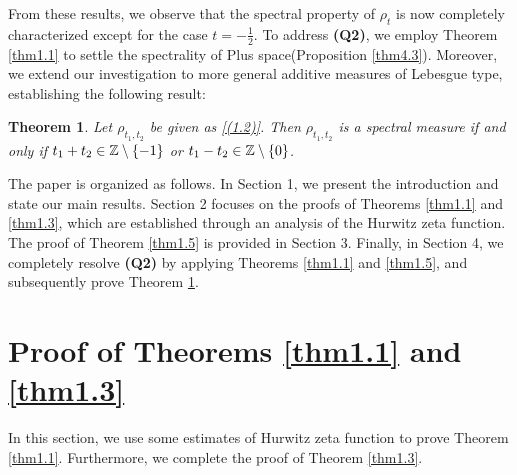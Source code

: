 \documentclass[12pt,psfig,reqno]{amsart}
\numberwithin{equation}{section}
\theoremstyle{plain}
\newtheorem{thm}{Theorem}[section]
\begin{document}
From these results, we observe that the spectral property of \(\rho_{t}\) is now completely characterized except for the case \(t = -\frac{1}{2}\). 
To address \textbf{(Q2)}, we employ Theorem  \ref{thm1.1} to settle the spectrality of Plus space(Proposition \ref{thm4.3}).  Moreover, we extend our investigation to more general additive measures of Lebesgue type, establishing the following result:
\begin{thm}\label{thm1.7}
Let $\rho_{t_1,t_2}$ be given as \eqref{(1.2)}. 
Then $\rho_{t_1,t_2}$ is a spectral measure if and only if $t_1+t_2\in\Bbb Z\setminus\{-1\}$ or $t_1-t_2\in\Bbb Z\setminus\{0\}
$. 
\end{thm}

The paper is organized as follows. In Section 1, we present the introduction and state our main results. Section 2 focuses on the proofs of Theorems \ref{thm1.1} and \ref{thm1.3}, which are established through an analysis of the Hurwitz zeta function. The proof of Theorem \ref{thm1.5} is provided in Section 3. Finally, in Section 4, we completely resolve \textbf{(Q2)} by applying Theorems \ref{thm1.1} and \ref{thm1.5}, and subsequently prove Theorem \ref{thm1.7}.


\section{Proof of Theorems \ref{thm1.1} and \ref{thm1.3}}
In this section, we use some estimates of Hurwitz zeta function to prove Theorem \ref{thm1.1}. 
Furthermore, we complete the proof of Theorem \ref{thm1.3}. 
\end{document}
